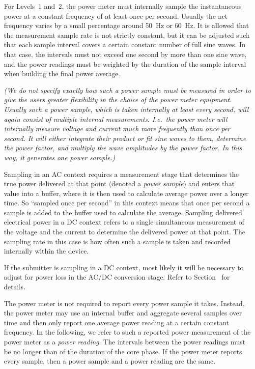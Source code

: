 For Levels~1 and~2, the power meter must internally sample the instantaneous power at a constant frequency of at least once per second.
Usually the net frequency varies by a small percentage around \SI{50}{\hertz} or \SI{60}{\hertz}.
It is allowed that the measurement sample rate is not strictly constant, but it can be adjusted such that each sample interval covers a certain constant number of full sine waves.
In that case, the intervals must not exceed one second by more than one sine wave, and the power readings must be weighted by the duration of the sample interval when building the final power average.

\textit{(We do not specify exactly how such a power sample must be measured in order to give the users greater flexibility in the choice of the power meter equipment.
Usually such a power sample, which is taken internally at least every second, will again consist of multiple internal measurements.
I.e.~the power meter will internally measure voltage and current much more frequently than once per second.
It will either integrate their product or fit sine waves to them, determine the power factor, and multiply the wave amplitudes by the power factor.
In this way, it generates one power sample.)}

Sampling in an AC context requires a measurement stage that determines the true power delivered at that point (denoted a \textit{power sample}) and enters that value into a buffer, where it is then used to calculate average power over a longer time.
So ``sampled once per second'' in this context means that once per second a sample is added to the buffer used to calculate the average.
Sampling delivered electrical power in a DC context refers to a single simultaneous measurement of the voltage and the current to determine the delivered power at that point.
The sampling rate in this case is how often such a sample is taken and recorded internally within the device.

If the submitter is sampling in a DC context, most likely it will be necessary to adjust for power loss in the AC/DC conversion stage.
Refer to Section~ for details.

The power meter is not required to report every power sample it takes.
Instead, the power meter may use an internal buffer and aggregate several samples over time and then only report one average power reading at a certain constant frequency.
In the following, we refer to such a reported power measurement of the power meter as a \textit{power reading}.
The intervals between the power readings must be no longer than \MaxReadingIntervalCorePhaseLTwoThree{} of the duration of the core phase.
If the power meter reports every sample, then a power sample and a power reading are the same.

